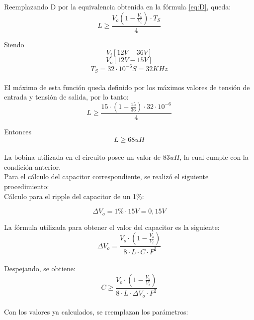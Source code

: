 Reemplazando D por la equivalencia obtenida en la fórmula \ref{eq:D}, queda:\\

\begin{equation}
    L \geq \frac{V_o(1-\frac{V_o}{V_i})\cdot T_S}{4}
\end{equation}

Siendo
\[V_i [12V-36V]\]
\[V_o [12V-15V]\]
\[T_S = 32 \cdot 10^{-6} S  = 32KHz\]\\

El máximo de esta función queda definido por los máximos valores de tensión de entrada y tensión de salida, por lo tanto:\\

\begin{equation}
    L \geq \frac{15 \cdot (1-\frac{15}{36}) \cdot 32 \cdot 10^{-6}}{4}
\end{equation}

Entonces \[L \geq 68uH\]\\

La bobina utilizada en el circuito posee un valor de \textbf{$83uH$}, la cual cumple con la condición anterior.\\

Para el cálculo del capacitor correspondiente, se realizó el siguiente procedimiento:\\

Cálculo para el ripple del capacitor de un 1\%: 

\begin{equation}
    \Delta V_o = 1\% \cdot 15V = 0,15V
\end{equation}

La fórmula utilizada para obtener el valor del capacitor es la siguiente:\\

\begin{equation}
    \Delta V_o = \frac{V_o \cdot (1-\frac{V_o}{V_i})}{8 \cdot L \cdot C \cdot F^2}
\end{equation}\\

Despejando, se obtiene:\\

\begin{equation}
    C \geq \frac{V_o \cdot  (1 - \frac{V_o}{V_i})}{8 \cdot L \cdot \Delta V_o \cdot F^2}
\end{equation}\\

Con los valores ya calculados, se reemplazan los parámetros:\\

